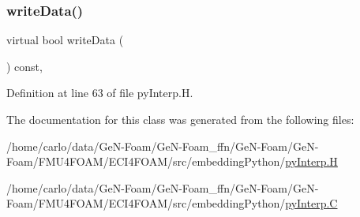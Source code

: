\subsubsection{\texorpdfstring{write\+Data()}{writeData()}}
{\footnotesize\ttfamily virtual bool write\+Data (\begin{DoxyParamCaption}\item[{Ostream \&}]{ }\end{DoxyParamCaption}) const\hspace{0.3cm}{\ttfamily [inline]}, {\ttfamily [virtual]}}



Definition at line 63 of file py\+Interp.\+H.



The documentation for this class was generated from the following files\+:\begin{DoxyCompactItemize}
\item 
/home/carlo/data/\+Ge\+N-\/\+Foam/\+Ge\+N-\/\+Foam\+\_\+ffn/\+Ge\+N-\/\+Foam/\+Ge\+N-\/\+Foam/\+F\+M\+U4\+F\+O\+A\+M/\+E\+C\+I4\+F\+O\+A\+M/src/embedding\+Python/\hyperlink{pyInterp_8H}{py\+Interp.\+H}\item 
/home/carlo/data/\+Ge\+N-\/\+Foam/\+Ge\+N-\/\+Foam\+\_\+ffn/\+Ge\+N-\/\+Foam/\+Ge\+N-\/\+Foam/\+F\+M\+U4\+F\+O\+A\+M/\+E\+C\+I4\+F\+O\+A\+M/src/embedding\+Python/\hyperlink{pyInterp_8C}{py\+Interp.\+C}\end{DoxyCompactItemize}
